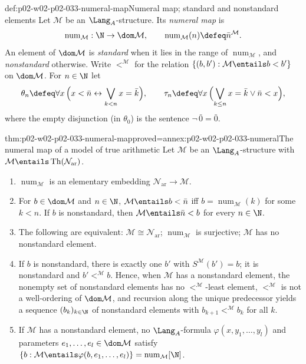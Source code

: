 \begin{hbdefinition}{def:p02-w02-p02-033-numeral-map}{Numeral map; standard and nonstandard elements}
Let \(\mathcal M\) be an \(\Lang_A\)-structure.  Its \emph{numeral map} is
\[
 \operatorname{num}_{\mathcal M}:\N\to\dom\mathcal M,\qquad
 \operatorname{num}_{\mathcal M}(n)\defeq\bar n^{\mathcal M}.
\]
An element of \(\dom\mathcal M\) is \emph{standard} when it lies in the range
of \(\operatorname{num}_{\mathcal M}\), and \emph{nonstandard} otherwise.
Write \(<^{\mathcal M}\) for the relation
\(\{(b,b'):\mathcal M\entails b<b'\}\) on \(\dom\mathcal M\).  For
\(n\in\N\) let
\[
 \theta_n\defeq\forall x\,\Bigl(x<\bar n\leftrightarrow
   \bigvee_{k<n}x=\bar k\Bigr),
 \qquad
 \tau_n\defeq\forall x\,\Bigl(\bigvee_{k\leq n}x=\bar k\lor\bar n<x\Bigr),
\]
where the empty disjunction (in \(\theta_0\)) is the sentence
\(\neg\,\bar 0=\bar 0\).
\end{hbdefinition}

\begin{hblemma}{thm:p02-w02-p02-033-numeral-map}{proved=annex:p02-w02-p02-033-numeral}{The numeral map of a model of true arithmetic}
Let \(\mathcal M\) be an \(\Lang_A\)-structure with
\(\mathcal M\entails\operatorname{Th}(\mathcal N_{\mathrm{ar}})\).
\begin{enumerate}
  \item \(\operatorname{num}_{\mathcal M}\) is an elementary embedding
        \(\mathcal N_{\mathrm{ar}}\to\mathcal M\).
  \item For \(b\in\dom\mathcal M\) and \(n\in\N\),
        \(\mathcal M\entails b<\bar n\) iff
        \(b=\operatorname{num}_{\mathcal M}(k)\) for some \(k<n\).  If \(b\)
        is nonstandard, then \(\mathcal M\entails\bar n<b\) for every
        \(n\in\N\).
  \item The following are equivalent: \(\mathcal M\cong\mathcal N_{\mathrm{ar}}\);
        \(\operatorname{num}_{\mathcal M}\) is surjective; \(\mathcal M\) has
        no nonstandard element.
  \item If \(b\) is nonstandard, there is exactly one \(b'\) with
        \(S^{\mathcal M}(b')=b\); it is nonstandard and \(b'<^{\mathcal M}b\).
        Hence, when \(\mathcal M\) has a nonstandard element, the nonempty set
        of nonstandard elements has no \(<^{\mathcal M}\)-least element,
        \(<^{\mathcal M}\) is not a well-ordering of \(\dom\mathcal M\), and
        recursion along the unique predecessor yields a sequence
        \((b_k)_{k\in\N}\) of nonstandard elements with
        \(b_{k+1}<^{\mathcal M}b_k\) for all \(k\).
  \item If \(\mathcal M\) has a nonstandard element, no \(\Lang_A\)-formula
        \(\varphi(x,y_1,\ldots,y_l)\) and parameters
        \(e_1,\ldots,e_l\in\dom\mathcal M\) satisfy
        \(\{b:\mathcal M\entails\varphi(b,e_1,\ldots,e_l)\}=
        \operatorname{num}_{\mathcal M}[\N]\).
\end{enumerate}
\end{hblemma}

